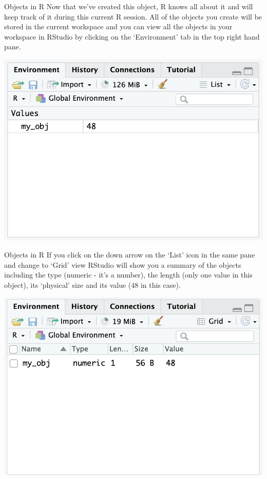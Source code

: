 \documentclass[aspectratio=169,xcolor=dvipsnames]{beamer}
\begin{document}
\begin{frame}[fragile]{Objects in R}
Now that we’ve created this object, R knows all about it and will keep track of it during this current R session. All of the objects you create will be stored in the current workspace and you can view all the objects in your workspace in RStudio by clicking on the ‘Environment’ tab in the top right hand pane.

\begin{center}
\includegraphics[scale=0.4]{images/env_obj.png}
\end{center}
\end{frame}

\begin{frame}[fragile]{Objects in R}
If you click on the down arrow on the ‘List’ icon in the same pane and change to ‘Grid’ view RStudio will show you a summary of the objects including the type (numeric - it’s a number), the length (only one value in this object), its ‘physical’ size and its value (48 in this case).
\begin{center}
\includegraphics[scale=0.4]{images/env_grid.png}
\end{center}
\end{frame}
\end{document}
